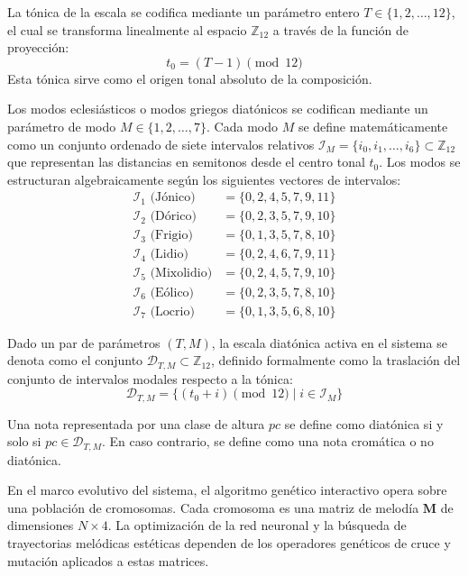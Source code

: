 La tónica de la escala se codifica mediante un parámetro entero $T \in \{1, 2, \dots, 12\}$, el cual se transforma linealmente al espacio $\mathbb{Z}_{12}$ a través de la función de proyección:
\begin{equation}
    t_0 = (T - 1) \pmod{12}
\end{equation}
Esta tónica sirve como el origen tonal absoluto de la composición.

Los modos eclesiásticos o modos griegos diatónicos se codifican mediante un parámetro de modo $M \in \{1, 2, \dots, 7\}$. Cada modo $M$ se define matemáticamente como un conjunto ordenado de siete intervalos relativos $\mathcal{I}_M = \{i_0, i_1, \dots, i_6\} \subset \mathbb{Z}_{12}$ que representan las distancias en semitonos desde el centro tonal $t_0$. Los modos se estructuran algebraicamente según los siguientes vectores de intervalos:
\begin{align}
    \mathcal{I}_1 \text{ (Jónico)} &= \{0, 2, 4, 5, 7, 9, 11\} \\
    \mathcal{I}_2 \text{ (Dórico)} &= \{0, 2, 3, 5, 7, 9, 10\} \\
    \mathcal{I}_3 \text{ (Frigio)} &= \{0, 1, 3, 5, 7, 8, 10\} \\
    \mathcal{I}_4 \text{ (Lidio)} &= \{0, 2, 4, 6, 7, 9, 11\} \\
    \mathcal{I}_5 \text{ (Mixolidio)} &= \{0, 2, 4, 5, 7, 9, 10\} \\
    \mathcal{I}_6 \text{ (Eólico)} &= \{0, 2, 3, 5, 7, 8, 10\} \\
    \mathcal{I}_7 \text{ (Locrio)} &= \{0, 1, 3, 5, 6, 8, 10\}
\end{align}

Dado un par de parámetros $(T, M)$, la escala diatónica activa en el sistema se denota como el conjunto $\mathcal{D}_{T,M} \subset \mathbb{Z}_{12}$, definido formalmente como la traslación del conjunto de intervalos modales respecto a la tónica:
\begin{equation}
    \mathcal{D}_{T,M} = \{ (t_0 + i) \pmod{12} \mid i \in \mathcal{I}_M \}
\end{equation}

Una nota representada por una clase de altura $pc$ se define como diatónica si y solo si $pc \in \mathcal{D}_{T,M}$. En caso contrario, se define como una nota cromática o no diatónica.

En el marco evolutivo del sistema, el algoritmo genético interactivo opera sobre una población de cromosomas. Cada cromosoma es una matriz de melodía $\mathbf{M}$ de dimensiones $N \times 4$. La optimización de la red neuronal y la búsqueda de trayectorias melódicas estéticas dependen de los operadores genéticos de cruce y mutación aplicados a estas matrices. 

